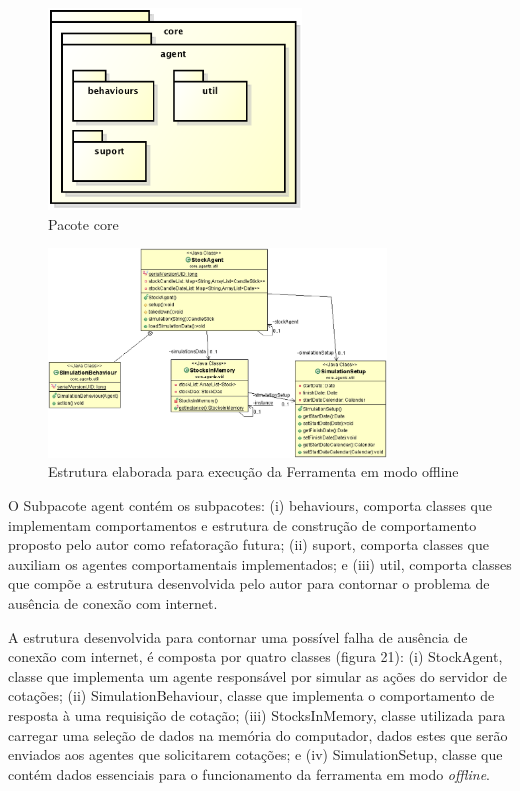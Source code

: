 \begin{figure}[h]
\centering
\label{f21}
\includegraphics[width=0.6\textwidth]{figuras/pacoteAgents}
\caption{Pacote core}
\end{figure}

\begin{figure}[h]
\centering
\label{f22}
\includegraphics[width=0.8\textwidth]{figuras/classesUtil}
\caption{Estrutura elaborada para execução da Ferramenta em modo offline}
\end{figure}

O Subpacote agent contém os subpacotes: (i) behaviours, comporta classes que implementam comportamentos e estrutura de construção de comportamento proposto pelo autor como refatoração futura; (ii) suport, comporta classes que auxiliam os agentes comportamentais implementados; e (iii) util, comporta classes que compõe a estrutura desenvolvida pelo autor para contornar o problema de ausência de conexão com internet. 

A estrutura desenvolvida para contornar uma possível falha de ausência de conexão com internet, é composta por quatro classes (figura 21): (i) StockAgent, classe que implementa um agente responsável por simular as ações do servidor de cotações; (ii) SimulationBehaviour, classe que implementa o comportamento de resposta à uma requisição de cotação; (iii) StocksInMemory, classe utilizada para carregar uma seleção de dados na memória do computador, dados estes que serão enviados aos agentes que solicitarem cotações; e (iv) SimulationSetup, classe que contém dados essenciais para o funcionamento da ferramenta em modo \textit{offline}.

